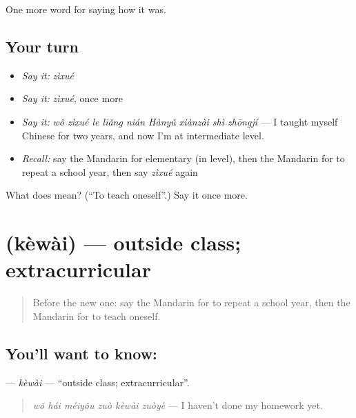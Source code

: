 \begin{grammarlens}[title={What you've built}]
One more word for saying how it was.
\end{grammarlens}

\subsection*{Your turn}
\begin{itemize}
\raggedright
  \item \emph{Say it:} \emph{zìxué}
  \item \emph{Say it:} \emph{zìxué}, once more
  \item \emph{Say it:} \emph{wǒ zìxué le liǎng nián Hànyǔ xiànzài shì zhōngjí} — I taught myself Chinese for two years, and now I'm at intermediate level.
  \item \emph{Recall:} say the Mandarin for elementary (in level), then the Mandarin for to repeat a school year, then say \emph{zìxué} again
\end{itemize}

\begin{tcolorbox}[breakable,colback=teal!4,colframe=teal!35!black,title={Before you move on}]
What does  mean? (\textquotedblleft{}To teach oneself\textquotedblright{}.) Say it once more.
\end{tcolorbox}
\section[\texorpdfstring{\zh{课外} (kèwài)}{课外 (kèwài)}]{ (kèwài) — outside class; extracurricular}

\label{lesson:ZH-C497-kewai}



\begin{quote}
Before the new one: say the Mandarin for to repeat a school year, then the Mandarin for to teach oneself.
\end{quote}

\subsection*{You'll want to know: }
\textbf{} — \emph{kèwài} — \textquotedblleft{}outside class; extracurricular\textquotedblright{}.

\begin{quote}
\textbf{} \emph{wǒ hái méiyǒu zuò kèwài zuòyè} — I haven't done my homework yet.
\end{quote}

